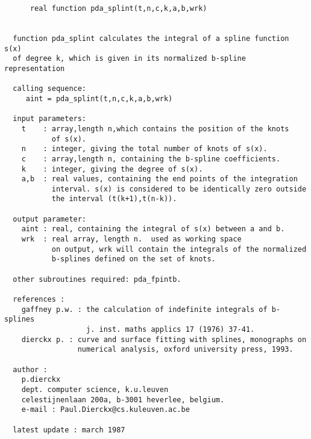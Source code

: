 \begin{verbatim}
      real function pda_splint(t,n,c,k,a,b,wrk)


  function pda_splint calculates the integral of a spline function s(x)
  of degree k, which is given in its normalized b-spline representation

  calling sequence:
     aint = pda_splint(t,n,c,k,a,b,wrk)

  input parameters:
    t    : array,length n,which contains the position of the knots
           of s(x).
    n    : integer, giving the total number of knots of s(x).
    c    : array,length n, containing the b-spline coefficients.
    k    : integer, giving the degree of s(x).
    a,b  : real values, containing the end points of the integration
           interval. s(x) is considered to be identically zero outside
           the interval (t(k+1),t(n-k)).

  output parameter:
    aint : real, containing the integral of s(x) between a and b.
    wrk  : real array, length n.  used as working space
           on output, wrk will contain the integrals of the normalized
           b-splines defined on the set of knots.

  other subroutines required: pda_fpintb.

  references :
    gaffney p.w. : the calculation of indefinite integrals of b-splines
                   j. inst. maths applics 17 (1976) 37-41.
    dierckx p. : curve and surface fitting with splines, monographs on
                 numerical analysis, oxford university press, 1993.

  author :
    p.dierckx
    dept. computer science, k.u.leuven
    celestijnenlaan 200a, b-3001 heverlee, belgium.
    e-mail : Paul.Dierckx@cs.kuleuven.ac.be

  latest update : march 1987
\end{verbatim}



